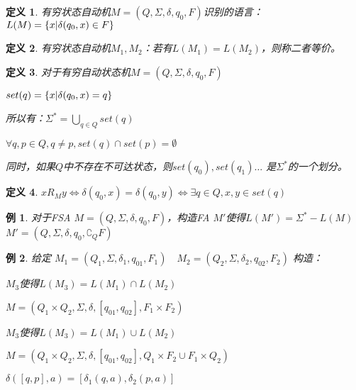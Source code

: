 \documentclass[twocolumn,zihao=5,linespread=1,heading=false,autoindent=0pt]{ctexart}
\DeclarePairedDelimiter{\set}{\{}{\}}
\theoremstyle{exampstyle} \newtheorem{definition}{定义}[section]
\theoremstyle{exampstyle} \newtheorem{example}{例}[section]
\theoremstyle{exampstyle} \newtheorem{theorem}{定理}[section]
\theoremstyle{exampstyle} \newtheorem{lemma}{引理}[section]
\theoremstyle{exampstyle} \newtheorem{myproof}{证明}[section]
\begin{document}
\begin{definition}
    有穷状态自动机$M = (Q, \Sigma, \delta, q_0, F)$识别的语言：
    $L(M) = \set*{x | \delta(q_0, x) \in F}$
\end{definition}

\begin{definition}
    有穷状态自动机$M_1, M_2$：若有$L(M_1) = L(M_2)$，则称二者等价。
\end{definition}

\begin{definition}
    对于有穷自动状态机$M = (Q, \Sigma, \delta, q_0, F)$
    
    $set(q) = \set*{x | \delta(q_0, x) = q}$

    所以有：$\Sigma^* = \bigcup_{q \in Q}set(q)$

    $\forall q,p \in Q, q \ne p, set(q) \cap set(p) = \emptyset $

    同时，如果$Q$中不存在不可达状态，则$set(q_0), set(q_1) \dots$
    是$\Sigma^*$的一个划分。
\end{definition}

\begin{definition}
    $
    x R_M y \iff \delta(q_0, x) = \delta(q_0, y)
            \iff \exists q \in Q, x, y \in set(q)
    $
\end{definition}


\begin{example}
    对于FSA $M = (Q, \Sigma, \delta, q_0, F)$，构造FA 
    $M'$使得$L(M') = \Sigma^* - L(M)$ \quad$M' = (Q, \Sigma, \delta, q_0, \complement_QF )$
\end{example}

\begin{example}
    给定 $
        M_1 = (Q_1, \Sigma, \delta_1, q_{01}, F_1)\quad
        M_2 = (Q_2, \Sigma, \delta_2, q_{02}, F_2)
    $
    构造：
    \begin{outline}[citemize]
        \1 $M_3$使得$L(M_3) = L(M_1) \cap L(M_2)$


        $M = (Q_1 \times Q_2, \Sigma, \delta, [q_{01}, q_{02}], F_1 \times F_2 )$


        \1 $M_3$使得$L(M_3) = L(M_1) \cup L(M_2)$

        $M = (Q_1 \times Q_2, \Sigma, \delta, [q_{01}, q_{02}], Q_1 \times F_2 \cup F_1 \times Q_2)$

        $\delta([q, p], a) = [\delta_1(q, a), \delta_2(p, a)]$
    \end{outline}
\end{example}
\end{document}
